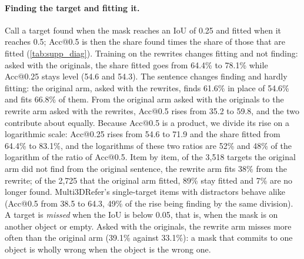 \paragraph{Finding the target and fitting it.}
Call a target found when the mask reaches an IoU of 0.25 and fitted when it reaches 0.5; Acc@0.5 is then the share found times the share of those that are fitted (\cref{tab:supp_diag}).
Training on the rewrites changes fitting and not finding: asked with the originals, the share fitted goes from 64.4\% to 78.1\% while Acc@0.25 stays level (54.6 and 54.3).
The sentence changes finding and hardly fitting: the original arm, asked with the rewrites, finds 61.6\% in place of 54.6\% and fits 66.8\% of them.
From the original arm asked with the originals to the rewrite arm asked with the rewrites, Acc@0.5 rises from 35.2 to 59.8, and the two contribute about equally.
Because Acc@0.5 is a product, we divide its rise on a logarithmic scale: Acc@0.25 rises from 54.6 to 71.9 and the share fitted from 64.4\% to 83.1\%, and the logarithms of these two ratios are 52\% and 48\% of the logarithm of the ratio of Acc@0.5.
Item by item, of the 3,518 targets the original arm did not find from the original sentence, the rewrite arm fits 38\% from the rewrite; of the 2,725 that the original arm fitted, 89\% stay fitted and 7\% are no longer found.
Multi3DRefer's single-target items with distractors behave alike (Acc@0.5 from 38.5 to 64.3, 49\% of the rise being finding by the same division).
A target is \emph{missed} when the IoU is below 0.05, that is, when the mask is on another object or empty.
Asked with the originals, the rewrite arm misses more often than the original arm (39.1\% against 33.1\%): a mask that commits to one object is wholly wrong when the object is the wrong one.


